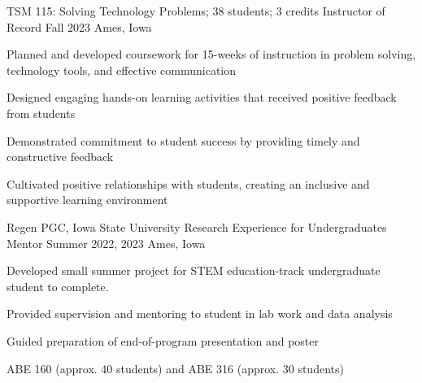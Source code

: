 

\begin{cventries}

  \cventry
    {TSM 115: Solving Technology Problems; 38 students; 3 credits} %
    {Instructor of Record} %
    {Fall 2023} %
    {Ames, Iowa} %
{
      \begin{cvitems} %
      \setlength\itemsep{.4em}
        \item {Planned and developed coursework for 15-weeks of instruction in problem solving, technology tools, and effective communication}
        \item {Designed engaging hands-on learning activities that received positive feedback from students}
        \item {Demonstrated commitment to student success by providing timely and constructive feedback }
        \item {Cultivated positive relationships with students, creating an inclusive and supportive learning environment}
      \end{cvitems}
    }
\vspace*{.5cm}
  \cventry
    {Regen PGC, Iowa State University} %
    {Research Experience for Undergraduates Mentor} %
    {Summer 2022, 2023} %
    {Ames, Iowa} %
    {
      \begin{cvitems} %
      \setlength\itemsep{.4em}
        \item {Developed small summer project for STEM education-track undergraduate student to complete.}
        \item {Provided supervision and mentoring to student in lab work and data analysis}
        \item {Guided preparation of end-of-program presentation and poster}
      \end{cvitems}
    }
\vspace*{.5cm}
 \cventry
    {ABE 160 (approx. 40 students) and ABE 316 (approx. 30 students)} %

\end{cventries}
